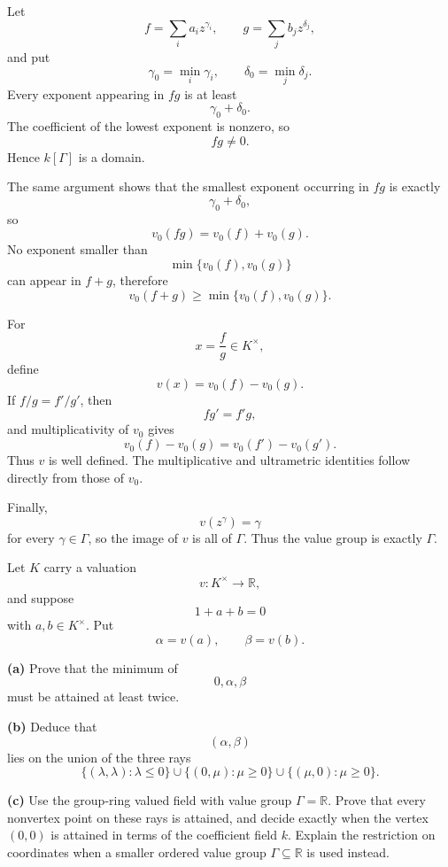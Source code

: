 \begin{solution}
Let
\[
f=\sum_i a_i z^{\gamma_i},
\qquad
g=\sum_j b_j z^{\delta_j},
\]
and put
\[
\gamma_0=\min_i\gamma_i,
\qquad
\delta_0=\min_j\delta_j.
\]
Every exponent appearing in \(fg\) is at least
\[
\gamma_0+\delta_0.
\]
The coefficient of the lowest exponent is nonzero, so
\[
fg\ne0.
\]
Hence \(k[\Gamma]\) is a domain.

The same argument shows that the smallest exponent occurring in \(fg\) is
exactly
\[
\gamma_0+\delta_0,
\]
so
\[
v_0(fg)=v_0(f)+v_0(g).
\]
No exponent smaller than
\[
\min\{v_0(f),v_0(g)\}
\]
can appear in \(f+g\), therefore
\[
v_0(f+g)\ge\min\{v_0(f),v_0(g)\}.
\]

For
\[
x=\frac fg\in K^\times,
\]
define
\[
v(x)=v_0(f)-v_0(g).
\]
If \(f/g=f'/g'\), then
\[
fg'=f'g,
\]
and multiplicativity of \(v_0\) gives
\[
v_0(f)-v_0(g)
=
v_0(f')-v_0(g').
\]
Thus \(v\) is well defined. The multiplicative and ultrametric identities
follow directly from those of \(v_0\).

Finally,
\[
v(z^\gamma)=\gamma
\]
for every \(\gamma\in\Gamma\), so the image of \(v\) is all of \(\Gamma\).
Thus the value group is exactly \(\Gamma\).
\end{solution}


\begin{problem}[CP-V-0040]
\label{prob:cp-v-0040}
Let \(K\) carry a valuation
\[
v:K^\times\to\mathbb R,
\]
and suppose
\[
1+a+b=0
\]
with \(a,b\in K^\times\). Put
\[
\alpha=v(a),
\qquad
\beta=v(b).
\]

\textbf{(a)} Prove that the minimum of
\[
0,\alpha,\beta
\]
must be attained at least twice.

\textbf{(b)} Deduce that
\[
(\alpha,\beta)
\]
lies on the union of the three rays
\[
\{(\lambda,\lambda):\lambda\le0\}
\cup
\{(0,\mu):\mu\ge0\}
\cup
\{(\mu,0):\mu\ge0\}.
\]

\textbf{(c)} Use the group-ring valued field with value group
\(\Gamma=\mathbb R\). Prove that every nonvertex point on these rays
is attained, and decide exactly when the vertex \((0,0)\) is attained
in terms of the coefficient field \(k\). Explain the restriction on
coordinates when a smaller ordered value group \(\Gamma\subseteq\mathbb R\)
is used instead.
\end{problem}

